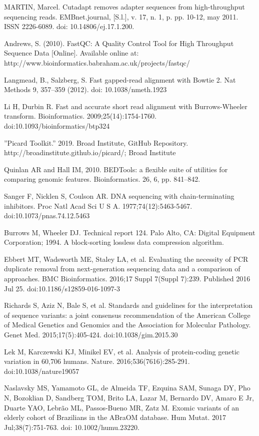 \documentclass[a4paper,12pt]{article}
\begin{document}
\begin{thebibliography}{100}
MARTIN, Marcel. Cutadapt removes adapter sequences from high-throughput sequencing reads. EMBnet.journal, [S.l.], v. 17, n. 1, p. pp. 10-12, may 2011. ISSN 2226-6089. doi: 10.14806/ej.17.1.200. 

Andrews, S. (2010). FastQC:  A Quality Control Tool for High Throughput Sequence Data [Online]. Available online at: http://www.bioinformatics.babraham.ac.uk/projects/fastqc/

Langmead, B., Salzberg, S. Fast gapped-read alignment with Bowtie 2. Nat Methods 9, 357–359 (2012). doi: 10.1038/nmeth.1923

Li H, Durbin R. Fast and accurate short read alignment with Burrows-Wheeler transform. Bioinformatics. 2009;25(14):1754-1760. doi:10.1093/bioinformatics/btp324

''Picard Toolkit.'' 2019. Broad Institute, GitHub Repository. http://broadinstitute.github.io/picard/; Broad Institute

Quinlan AR and Hall IM, 2010. BEDTools: a flexible suite of utilities for comparing genomic features. Bioinformatics. 26, 6, pp. 841–842.

Sanger F, Nicklen S, Coulson AR. DNA sequencing with chain-terminating inhibitors. Proc Natl Acad Sci U S A. 1977;74(12):5463-5467. doi:10.1073/pnas.74.12.5463

Burrows M, Wheeler DJ. Technical report 124. Palo Alto, CA: Digital Equipment Corporation; 1994. A block-sorting lossless data compression algorithm.

Ebbert MT, Wadsworth ME, Staley LA, et al. Evaluating the necessity of PCR duplicate removal from next-generation sequencing data and a comparison of approaches. BMC Bioinformatics. 2016;17 Suppl 7(Suppl 7):239. Published 2016 Jul 25. doi:10.1186/s12859-016-1097-3

Richards S, Aziz N, Bale S, et al. Standards and guidelines for the interpretation of sequence variants: a joint consensus recommendation of the American College of Medical Genetics and Genomics and the Association for Molecular Pathology. Genet Med. 2015;17(5):405-424. doi:10.1038/gim.2015.30

Lek M, Karczewski KJ, Minikel EV, et al. Analysis of protein-coding genetic variation in 60,706 humans. Nature. 2016;536(7616):285-291. doi:10.1038/nature19057

Naslavsky MS, Yamamoto GL, de Almeida TF, Ezquina SAM, Sunaga DY, Pho N, Bozoklian D, Sandberg TOM, Brito LA, Lazar M, Bernardo DV, Amaro E Jr, Duarte YAO, Lebrão ML, Passos-Bueno MR, Zatz M. Exomic variants of an elderly cohort of Brazilians in the ABraOM database. Hum Mutat. 2017 Jul;38(7):751-763. doi: 10.1002/humu.23220.


\end{thebibliography}
\end{document}
